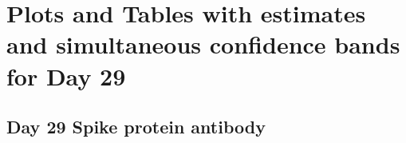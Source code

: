 \documentclass[]{book}
\theoremstyle{definition}
\theoremstyle{definition}
\theoremstyle{definition}
\newcommand{\1}{\mathbbm{1}}
\begin{document}
\newpage

\newpage

\hypertarget{plots-and-tables-with-estimates-and-simultaneous-confidence-bands-for-day-29}{%
\section{Plots and Tables with estimates and simultaneous confidence bands for Day 29}\label{plots-and-tables-with-estimates-and-simultaneous-confidence-bands-for-day-29}}

\newpage

\newpage

\hypertarget{day-29-spike-protein-antibody-2}{%
\subsection{Day 29 Spike protein antibody}\label{day-29-spike-protein-antibody-2}}
\end{document}

